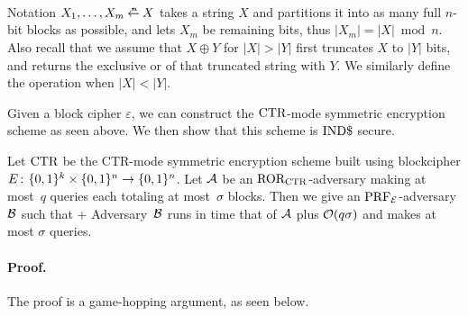 Notation $X_1,\ldots,X_m \getparse{n} X$ takes a string $X$ and partitions it
into as many full $n$-bit blocks as possible, and lets $X_m$ be remaining bits,
thus $|X_m| = |X| \bmod n$. Also recall that we assume that  $X \oplus Y$ for
$|X| > |Y|$ 
first truncates $X$ to $|Y|$ bits, and returns the exclusive or of that
truncated string with $Y$. We similarly define the operation when $|X| < |Y|$.

Given a block cipher $\varepsilon$, we can construct the $\textnormal{CTR}$-mode
symmetric encryption scheme as seen above. We then show that
this scheme is $\textnormal{IND\$}$ secure.

\begin{theorem*}
Let $\textnormal{CTR}$ be the CTR-mode symmetric encryption scheme built using blockcipher
$E{{\kern .05em}\colon{\kern .05em}}\{0,1\}^k\times\{0,1\}^n\rightarrow\{0,1\}^n$. Let ${\mathcal A}$ be an
$\textnormal{ROR}_{\textnormal{CTR}}$-adversary making at most~$q$ queries each totaling at most~$\sigma$
blocks. Then we give an $\textnormal{PRF}_{\cal E}$-adversary ${\mathcal B}$ such
that
\bnm
  \AdvROR{\CTR}{\advA} \le \AdvPRF{\cipher}{\advB} + 
\enm
Adversary~${\mathcal B}$ runs in time that of ${\mathcal A}$ plus ${\cal O}(q\sigma)$ and makes at most
$\sigma$ queries.
\end{theorem*}

\paragraph{Proof.}

The proof is a game-hopping argument, as seen below.

